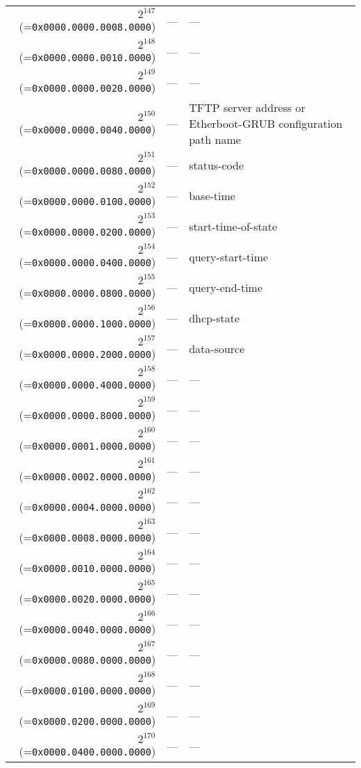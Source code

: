 \documentclass[documentation]{subfiles}
\begin{document}
\begin{small}
\begin{longtable}{rcl}
        $2^{147}$ (={\tt 0x0000.0000.0008.0000}) & ---   & --- \\
        $2^{148}$ (={\tt 0x0000.0000.0010.0000}) & ---   & --- \\
        $2^{149}$ (={\tt 0x0000.0000.0020.0000}) & ---   & --- \\
        $2^{150}$ (={\tt 0x0000.0000.0040.0000}) & ---   & TFTP server address or Etherboot-GRUB configuration path name \\
        $2^{151}$ (={\tt 0x0000.0000.0080.0000}) & ---   & status-code \\
        $2^{152}$ (={\tt 0x0000.0000.0100.0000}) & ---   & base-time \\
        $2^{153}$ (={\tt 0x0000.0000.0200.0000}) & ---   & start-time-of-state \\
        $2^{154}$ (={\tt 0x0000.0000.0400.0000}) & ---   & query-start-time \\
        $2^{155}$ (={\tt 0x0000.0000.0800.0000}) & ---   & query-end-time \\
        $2^{156}$ (={\tt 0x0000.0000.1000.0000}) & ---   & dhcp-state \\
        $2^{157}$ (={\tt 0x0000.0000.2000.0000}) & ---   & data-source \\
        $2^{158}$ (={\tt 0x0000.0000.4000.0000}) & ---   & --- \\
        $2^{159}$ (={\tt 0x0000.0000.8000.0000}) & ---   & --- \\
        $2^{160}$ (={\tt 0x0000.0001.0000.0000}) & ---   & --- \\
        $2^{161}$ (={\tt 0x0000.0002.0000.0000}) & ---   & --- \\
        $2^{162}$ (={\tt 0x0000.0004.0000.0000}) & ---   & --- \\
        $2^{163}$ (={\tt 0x0000.0008.0000.0000}) & ---   & --- \\
        $2^{164}$ (={\tt 0x0000.0010.0000.0000}) & ---   & --- \\
        $2^{165}$ (={\tt 0x0000.0020.0000.0000}) & ---   & --- \\
        $2^{166}$ (={\tt 0x0000.0040.0000.0000}) & ---   & --- \\
        $2^{167}$ (={\tt 0x0000.0080.0000.0000}) & ---   & --- \\
        $2^{168}$ (={\tt 0x0000.0100.0000.0000}) & ---   & --- \\
        $2^{169}$ (={\tt 0x0000.0200.0000.0000}) & ---   & --- \\
        $2^{170}$ (={\tt 0x0000.0400.0000.0000}) & ---   & --- \\

\end{longtable}
\end{small}
\end{document}
